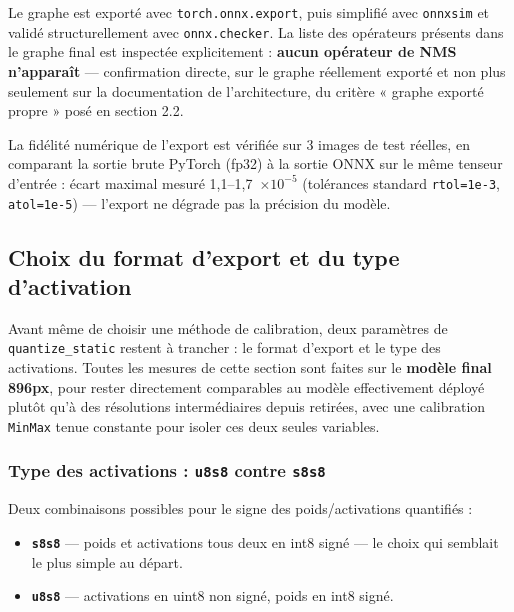 \documentclass[11pt,a4paper]{article}
\let\Oldsubsection\subsection
\renewcommand{\subsection}{\FloatBarrier\Oldsubsection}
\let\Oldsubsubsection\subsubsection
\renewcommand{\subsubsection}{\FloatBarrier\Oldsubsubsection}
\begin{document}
    Le graphe est exporté avec \texttt{torch.onnx.export}, puis
    simplifié avec \texttt{onnxsim} et validé structurellement avec
    \texttt{onnx.checker}. La liste des opérateurs présents dans le graphe
    final est inspectée explicitement : \textbf{aucun opérateur de NMS
    n'apparaît} --- confirmation directe, sur le graphe réellement exporté
    et non plus seulement sur la documentation de l'architecture, du
    critère « graphe exporté propre » posé en section 2.2.
    
    La fidélité numérique de l'export est vérifiée sur 3 images de test
    réelles, en comparant la sortie brute PyTorch (fp32) à la sortie ONNX
    sur le même tenseur d'entrée : écart maximal mesuré \mbox{1,1--1,7
    $\times 10^{-5}$} (tolérances standard
    \texttt{rtol=1e-3}, \texttt{atol=1e-5}) --- l'export ne dégrade pas la
    précision du modèle.
    
    \subsection{Choix du format d'export et du type d'activation}
    
    Avant même de choisir une méthode de calibration, deux paramètres de
    \texttt{quantize\_static} restent à trancher : le format d'export et
    le type des activations. Toutes les mesures de cette section sont
    faites sur le \textbf{modèle final 896px}, pour rester directement
    comparables au modèle effectivement déployé plutôt qu'à des
    résolutions intermédiaires depuis retirées, avec une calibration
    \texttt{MinMax} tenue constante pour isoler ces deux seules variables.
    
    \subsubsection{Type des activations : \texttt{u8s8} contre \texttt{s8s8}}
    
    Deux combinaisons possibles pour le signe des poids/activations
    quantifiés :
    
    \begin{itemize}[leftmargin=1.5em]
      \item \textbf{\texttt{s8s8}} --- poids et activations tous deux en
        int8 signé --- le choix qui semblait le plus simple au départ.
      \item \textbf{\texttt{u8s8}} --- activations en uint8 non signé,
        poids en int8 signé.
    \end{itemize}
    
\end{document}
